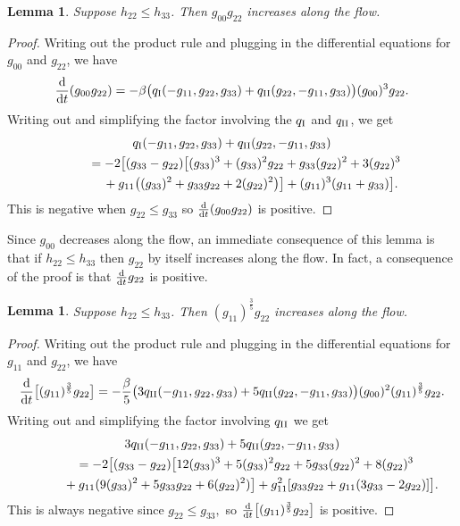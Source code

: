 \documentclass[10pt,a4paper]{amsart}
\numberwithin{equation}{section}
\newtheorem{Lemma}[Theorem]{Lemma}
\newcommand{\dtime}{\frac{{\rm d}}{{\rm d} t}} %
\begin{document}
\begin{Lemma} \label{g00g22prodlemma}
Suppose $h_{22} \leq h_{33}$. Then $g_{00} g_{22}$ increases along the flow.
\end{Lemma}
\begin{proof}
Writing out the product rule and plugging in the differential equations for $g_{00}$ and $g_{22}$, we have
\[
\dtime (g_{00} g_{22})
	= -\beta \bigl(q_{\rm I}(-g_{11}, g_{22}, g_{33}) + q_{\rm II}(g_{22}, -g_{11}, g_{33})\bigr) (g_{00})^3 g_{22}.
\]
Writing out and simplifying the factor involving the $q_{\rm I}$ and $q_{\rm II}$, we get
\begin{gather*}
q_{\rm I}(-g_{11}, g_{22}, g_{33}) + q_{\rm II}(g_{22}, -g_{11}, g_{33}) \\
 \qquad{} = -2\big[(g_{33}-g_{22})\big[(g_{33})^3 + (g_{33})^2 g_{22} + g_{33} (g_{22})^2 + 3(g_{22})^3 \\
 \qquad \quad {}+ g_{11}\big((g_{33})^2 + g_{33} g_{22} + 2(g_{22})^2\big)\big]
 + (g_{11})^3 (g_{11} + g_{33})\big].
\end{gather*}
This is negative when $g_{22} \leq g_{33}$ so $\dtime (g_{00} g_{22})$ is positive.
\end{proof}

Since $g_{00}$ decreases along the flow, an immediate consequence of this lemma is that if $h_{22} \leq h_{33}$ then $g_{22}$ by itself increases along the flow. In fact, a consequence of the proof is that $\dtime g_{22}$ is positive.

\begin{Lemma} \label{g11tothepg22prodlemma} Suppose $h_{22} \leq h_{33}$. Then $(g_{11})^{\frac{3}{5}} g_{22}$ increases along the flow.
\end{Lemma}
\begin{proof}
Writing out the product rule and plugging in the differential equations for $g_{11}$ and $g_{22}$, we have
\[
\dtime \big[(g_{11})^{\frac{3}{5}} g_{22} \big]
	= -\frac{\beta}{5} \bigl(3 q_{\rm II}(-g_{11}, g_{22}, g_{33}) + 5 q_{\rm II}(g_{22}, -g_{11}, g_{33}) \bigr) (g_{00})^2 (g_{11})^{\frac{3}{5}} g_{22}.
\]
Writing out and simplifying the factor involving $q_{\rm II}$ we get
\begin{gather*}
3 q_{\rm II}(-g_{11}, g_{22}, g_{33}) + 5 q_{\rm II}(g_{22}, -g_{11}, g_{33}) \\
\qquad{} = -2\big[(g_{33}-g_{22})\big[12(g_{33})^3 + 5(g_{33})^2g_{22} + 5g_{33}(g_{22})^2 + 8(g_{22})^3 \\
\qquad \quad {}+ g_{11}(9(g_{33})^2 + 5g_{33}g_{22} + 6(g_{22})^2)\big]
 + g_{11}^2[g_{33}g_{22} + g_{11}(3g_{33} - 2g_{22})] \big].
\end{gather*}
This is always negative since $g_{22} \leq g_{33},$ so $\dtime \big[(g_{11})^{\frac{3}{5}} g_{22} \big]$ is positive.
\end{proof}
\end{document}
